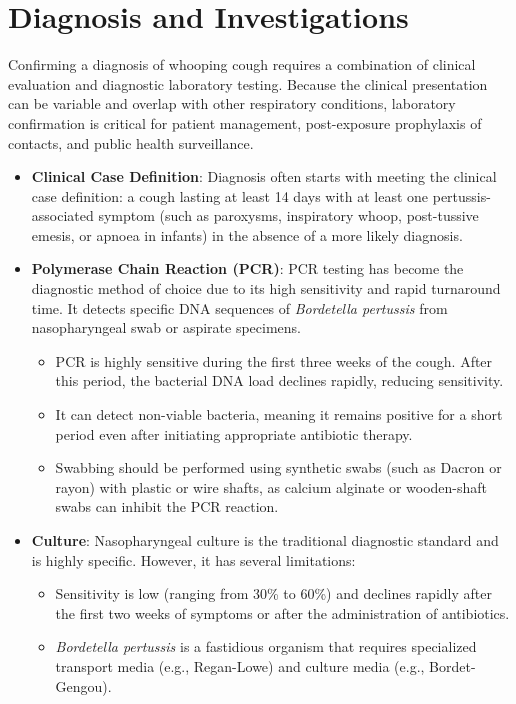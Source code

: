 \section*{Diagnosis and Investigations}
Confirming a diagnosis of whooping cough requires a combination of clinical evaluation and diagnostic laboratory testing. Because the clinical presentation can be variable and overlap with other respiratory conditions, laboratory confirmation is critical for patient management, post-exposure prophylaxis of contacts, and public health surveillance.
\begin{itemize}
    \item \textbf{Clinical Case Definition}: Diagnosis often starts with meeting the clinical case definition: a cough lasting at least 14 days with at least one pertussis-associated symptom (such as paroxysms, inspiratory whoop, post-tussive emesis, or apnoea in infants) in the absence of a more likely diagnosis.
    \item \textbf{Polymerase Chain Reaction (PCR)}: PCR testing has become the diagnostic method of choice due to its high sensitivity and rapid turnaround time. It detects specific DNA sequences of \textit{Bordetella pertussis} from nasopharyngeal swab or aspirate specimens.
    \begin{itemize}
        \item PCR is highly sensitive during the first three weeks of the cough. After this period, the bacterial DNA load declines rapidly, reducing sensitivity.
        \item It can detect non-viable bacteria, meaning it remains positive for a short period even after initiating appropriate antibiotic therapy.
        \item Swabbing should be performed using synthetic swabs (such as Dacron or rayon) with plastic or wire shafts, as calcium alginate or wooden-shaft swabs can inhibit the PCR reaction.
    \end{itemize}
    \item \textbf{Culture}: Nasopharyngeal culture is the traditional diagnostic standard and is highly specific. However, it has several limitations:
    \begin{itemize}
        \item Sensitivity is low (ranging from 30\% to 60\%) and declines rapidly after the first two weeks of symptoms or after the administration of antibiotics.
        \item \textit{Bordetella pertussis} is a fastidious organism that requires specialized transport media (e.g., Regan-Lowe) and culture media (e.g., Bordet-Gengou).

\end{itemize}
\end{itemize}
